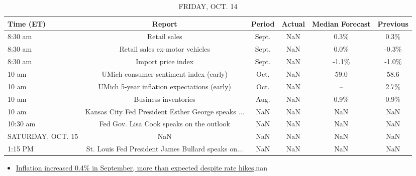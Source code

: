 \documentclass{article}%
\begin{document}
%


\begin{table}[htbp]%
\caption{FRIDAY, OCT. 14}%
\centering%
\begin{adjustbox}{width=1\textwidth}%
\begin{tabular}{lccccc}
\toprule
        Time (ET) &                                             Report & Period & Actual & Median Forecast & Previous \\
\midrule
          8:30 am &                                       Retail sales &  Sept. &    NaN &            0.3\% &     0.3\% \\
          8:30 am &                     Retail sales ex-motor vehicles &  Sept. &    NaN &            0.0\% &    -0.3\% \\
          8:30 am &                                 Import price index &  Sept. &    NaN &           -1.1\% &    -1.0\% \\
            10 am &             UMich consumer sentiment index (early) &   Oct. &    NaN &            59.0 &     58.6 \\
            10 am &        UMich 5-year inflation expectations (early) &   Oct. &    NaN &              -- &     2.7\% \\
            10 am &                               Business inventories &   Aug. &    NaN &            0.9\% &     0.9\% \\
            10 am & Kansas City Fed President Esther George speaks ... &    NaN &    NaN &             NaN &      NaN \\
         10:30 am &           Fed Gov. Lisa Cook speaks on the outlook &    NaN &    NaN &             NaN &      NaN \\
SATURDAY, OCT. 15 &                                                NaN &    NaN &    NaN &             NaN &      NaN \\
          1:15 PM & St. Louis Fed President James Bullard speaks on... &    NaN &    NaN &             NaN &      NaN \\
\bottomrule
\end{tabular}
%
\end{adjustbox}%
\end{table}

%
\begin{itemize}%
\item%
\href{https://reddit.com/r/Economics/comments/y2xm71/inflation\_increased\_04\_in\_september\_more\_than/}{Inflation increased 0.4\% in September, more than expected despite rate hikes},nan%
\end{itemize}%
\end{document}

